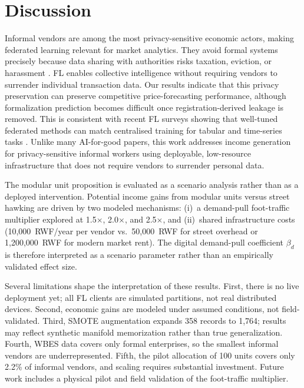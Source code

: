 \documentclass{article}
\begin{document}
\section{Discussion}
\label{sec:discussion}

Informal vendors are among the most privacy-sensitive economic actors, making federated learning relevant for market analytics. They avoid formal systems precisely because data sharing with authorities risks taxation, eviction, or harassment \cite{chen2023rethinking}.
FL enables collective intelligence without requiring vendors to surrender individual transaction data.
Our results indicate that this privacy preservation can preserve competitive price-forecasting performance, although formalization prediction becomes difficult once registration-derived leakage is removed.
This is consistent with recent FL surveys showing that well-tuned federated methods can match centralised training for tabular and time-series tasks \cite{kairouz2021advances,wen2023survey}.
Unlike many AI-for-good papers, this work addresses income generation for privacy-sensitive informal workers using deployable, low-resource infrastructure that does not require vendors to surrender personal data.

The modular unit proposition is evaluated as a scenario analysis rather than as a deployed intervention. Potential income gains from modular units versus street hawking are driven by two modeled mechanisms: (i)~a demand-pull foot-traffic multiplier explored at 1.5$\times$, 2.0$\times$, and 2.5$\times$, and (ii)~shared infrastructure costs (10,000~RWF/year per vendor vs.\ 50,000~RWF for street overhead or 1,200,000~RWF for modern market rent).
The digital demand-pull coefficient $\beta_d$ is therefore interpreted as a scenario parameter rather than an empirically validated effect size.

Several limitations shape the interpretation of these results. First, there is no live deployment yet; all FL clients are simulated partitions, not real distributed devices.
Second, economic gains are modeled under assumed conditions, not field-validated.
Third, SMOTE augmentation expands 358 records to 1,764; results may reflect synthetic manifold memorization rather than true generalization.
Fourth, WBES data covers only formal enterprises, so the smallest informal vendors are underrepresented.
Fifth, the pilot allocation of 100 units covers only 2.2\% of informal vendors, and scaling requires substantial investment.
Future work includes a physical pilot and field validation of the foot-traffic multiplier.
\end{document}
